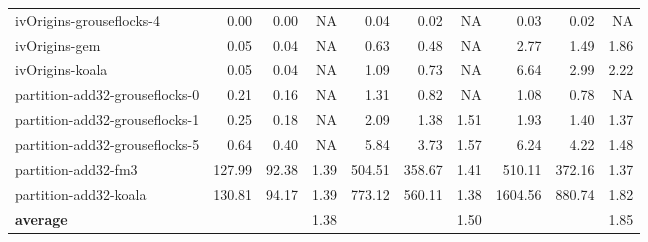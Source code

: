 \begin{tabular}{l|rrr|rrr|rrr}
       ivOrigins-grouseflocks-4 &   0.00 &  0.00 &       NA &   0.04 &   0.02 &       NA &     0.03 &    0.02 &    NA \\
                  ivOrigins-gem &   0.05 &  0.04 &       NA &   0.63 &   0.48 &       NA &     2.77 &    1.49 &  1.86 \\
                ivOrigins-koala &   0.05 &  0.04 &       NA &   1.09 &   0.73 &       NA &     6.64 &    2.99 &  2.22 \\
 partition-add32-grouseflocks-0 &   0.21 &  0.16 &       NA &   1.31 &   0.82 &       NA &     1.08 &    0.78 &    NA \\
 partition-add32-grouseflocks-1 &   0.25 &  0.18 &       NA &   2.09 &   1.38 &     1.51 &     1.93 &    1.40 &  1.37 \\
 partition-add32-grouseflocks-5 &   0.64 &  0.40 &       NA &   5.84 &   3.73 &     1.57 &     6.24 &    4.22 &  1.48 \\
            partition-add32-fm3 & 127.99 & 92.38 &     1.39 & 504.51 & 358.67 &     1.41 &   510.11 &  372.16 &  1.37 \\
          partition-add32-koala & 130.81 & 94.17 &     1.39 & 773.12 & 560.11 &     1.38 &  1604.56 &  880.74 &  1.82 \\
\midrule
\textbf{average} & & & 1.38 & & & 1.50 & & & 1.85 \\
\bottomrule
\end{tabular}
